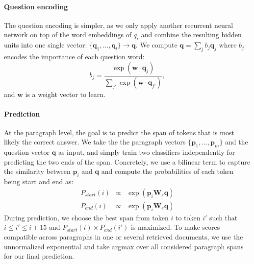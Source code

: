 \documentclass[11pt,a4paper]{article}
\begin{document}
\paragraph{\textbf{Question encoding}} The question encoding is simpler, as we only apply another recurrent neural network on top of the word embeddings of $q_i$ and combine the resulting hidden units into one single vector: $\{\mathbf{q}_1, \ldots, \mathbf{q}_l\} \rightarrow \mathbf{q}$. We compute $\mathbf{q} = \sum_j{b_j \mathbf{q}_j}$ where $b_j$ encodes the importance of each question word:
\begin{equation*}
	b_j = \frac{\exp(\mathbf{w} \cdot \mathbf{q}_j)}{\sum_{j'}{\exp(\mathbf{w} \cdot \mathbf{q}_{j'})}},
\end{equation*}
and $\mathbf{w}$ is a weight vector to learn.

\paragraph{\textbf{Prediction}} At the paragraph level, the goal is to predict the span of tokens that is most likely the correct answer. We take the
the paragraph vectors $\{\mathbf{p}_1, \ldots, \mathbf{p}_m\}$ and the question vector $\mathbf{q}$ as input, and simply train two classifiers independently for predicting the two ends of the span. Concretely, we use a bilinear term to capture the similarity between $\mathbf{p}_i$ and $\mathbf{q}$ and compute the probabilities of each token being start and end as:
\begin{eqnarray*}
P_{start}(i) & \propto & \exp \left(\mathbf{p}_i \mathbf{W}_{s} \mathbf{q}\right) \\
P_{end}(i) & \propto & \exp \left(\mathbf{p}_i \mathbf{W}_{e} \mathbf{q}\right)
\end{eqnarray*}
During prediction, we choose the best span from token $i$ to token $i'$ such that $i \leq i' \leq i + 15$ and $P_{start}(i) \times P_{end}(i')$ is maximized.
To make scores compatible across paragraphs in one or several retrieved documents, we use the unnormalized exponential and take argmax over all considered paragraph spans for our final prediction.
\end{document}
